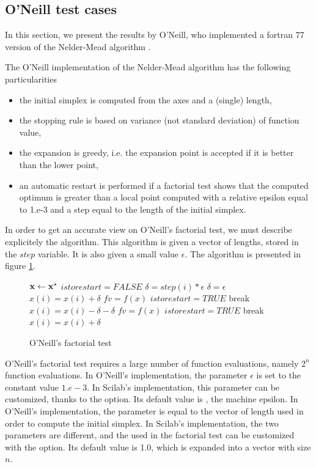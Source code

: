 \subsection{O'Neill test cases}

In this section, we present the results by O'Neill, who 
implemented a fortran 77 version of the Nelder-Mead algorithm
\cite{O'Neill1971AAF}.

The O'Neill implementation of the Nelder-Mead algorithm has the following 
particularities 
\begin{itemize}
\item the initial simplex is computed from the axes and a (single) length,
\item the stopping rule is based on variance (not standard deviation) of function value,
\item the expansion is greedy, i.e. the expansion point is accepted if it is better than the lower point,
\item an automatic restart is performed if a factorial test shows that the 
computed optimum is greater than a local point computed with a relative 
epsilon equal to 1.e-3 and a step equal to the length of the initial simplex.
\end{itemize}

In order to get an accurate view on O'Neill's factorial test,
we must describe explicitely the algorithm.
This algorithm is given a vector of lengths, stored in the 
$step$ variable. It is also given a small value $\epsilon$.
The algorithm is presented in figure \ref{algo-factorialtest}.

\begin{figure}[htbp]
\begin{algorithmic}
\STATE $\mathbf{x} \gets \mathbf{x}^\star$
\STATE $istorestart = FALSE$
  \STATE $\delta = step ( i ) * \epsilon$
    \STATE $\delta = \epsilon$
  \ENDIF
  \STATE $x ( i ) = x ( i ) + \delta$
  \STATE $fv = f ( x ) $
    \STATE $istorestart = TRUE$
    \STATE    break
  \ENDIF
  \STATE $x ( i ) = x ( i ) - \delta - \delta $
  \STATE $fv = f ( x ) $
    \STATE $istorestart = TRUE$
    \STATE    break
  \ENDIF
  \STATE $x ( i ) = x ( i ) + \delta$
\ENDFOR
\end{algorithmic}
\caption{O'Neill's factorial test}
\label{algo-factorialtest}
\end{figure}

O'Neill's factorial test requires a large number of function evaluations, namely 
$2^n$ function evaluations. In O'Neill's implementation, the parameter
$\epsilon$ is set to the constant value $1.e-3$.
In Scilab's implementation, this parameter can be customized, 
thanks to the  option. Its default value is ,
the machine epsilon. In O'Neill's implementation, the parameter 
is equal to the vector of length used in order to compute the initial 
simplex. In Scilab's implementation, the two parameters are different,
and the  used in the factorial test can be customized 
with the  option. Its default value is 1.0, which is 
expanded into a vector with size $n$.


